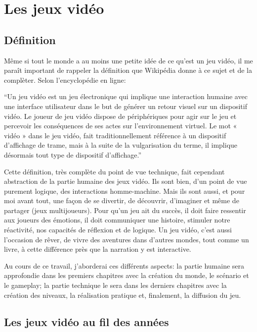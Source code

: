 \section{Les jeux vidéo}
\subsection{Définition}
Même si tout le monde a au moins une petite idée de ce qu'est un jeu vidéo, il me paraît important de rappeler la définition que Wikipédia donne à ce sujet et de la complèter. Selon l'encyclopédie en ligne:

\begin{displayquote}
\enquote{Un jeu vidéo est un jeu électronique qui implique une interaction humaine avec une interface utilisateur dans le but de générer un retour visuel sur un dispositif vidéo. Le joueur de jeu vidéo dispose de périphériques pour agir sur le jeu et percevoir les conséquences de ses actes sur l'environnement virtuel. Le mot « vidéo » dans le jeu vidéo, fait traditionnellement référence à un dispositif d'affichage de trame, mais à la suite de la vulgarisation du terme, il implique désormais tout type de dispositif d'affichage.}\cite{Jeuvideo_}
\end{displayquote}

Cette définition, très complète du point de vue technique, fait cependant abstraction de la partie humaine des jeux vidéo. Ils sont bien, d'un point de vue purement logique, des interactions homme-machine. Mais ils sont aussi, et pour moi avant tout, une façon de se divertir, de découvrir, d'imaginer et même de partager (jeux multijoueurs). Pour qu'un jeu ait du succès, il doit faire ressentir aux joueurs des émotions, il doit communiquer une histoire, stimuler notre réactivité, nos capacités de réflexion et de logique. Un jeu vidéo, c'est aussi l'occasion de rêver, de vivre des aventures dans d'autres mondes, tout comme un livre, à cette différence près que la narration y est interactive.

Au cours de ce travail, j'aborderai ces différents aspects: la partie humaine sera approfondie dans les premiers chapitres avec la création du monde, le scénario et le gameplay; la partie technique le sera dans les derniers chapitres avec la création des niveaux, la réalisation pratique et, finalement, la diffusion du jeu.


\subsection{Les jeux vidéo au fil des années}

